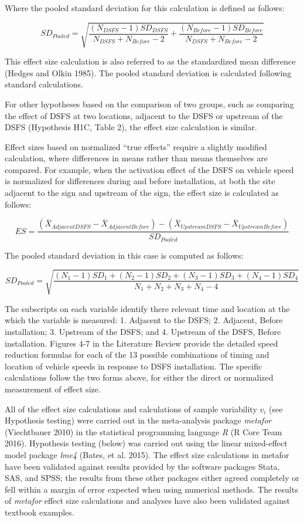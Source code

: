 \documentclass[]{article}
\begin{document}
Where the pooled standard deviation for this calculation is defined as
follows:

\[
SD_{Pooled} = \sqrt{\frac{(N_{DSFS}-1)SD_{DSFS}}{N_{DSFS} + N_{Before} -2 } + \frac{(N_{Before}-1)SD_{Before}}{N_{DSFS} + N_{Before} -2 }}
\]

This effect size calculation is also referred to as the standardized
mean difference (Hedges and Olkin 1985). The pooled standard deviation
is calculated following standard calculations.

For other hypotheses based on the comparison of two groups, such as
comparing the effect of DSFS at two locations, adjacent to the DSFS or
upstream of the DSFS (Hypothesis H1C, Table 2), the effect size
calculation is similar.

Effect sizes based on normalized ``true effects'' require a slightly
modified calculation, where differences in means rather than means
themselves are compared. For example, when the activation effect of the
DSFS on vehicle speed is normalized for differences during and before
installation, at both the site adjacent to the sign and upstream of the
sign, the effect size is calculated as follows:

\[ ES = \frac{(\bar{X}_{Adjacent DSFS} - \bar{X}_{Adjacent Before}) - (\bar{X}_{Upstream DSFS} - \bar{X}_{Upstream Before})}{SD_{Pooled}} \]

The pooled standard deviation in this case is computed as follows:

\[
SD_{Pooled} = \sqrt{\frac{(N_{1}-1)SD_{1} + (N_{2}-1)SD_{2} + (N_{3}-1)SD_{3} + (N_{4}-1)SD_{4} }{N_{1}+N_{2} + N_{3} + N_{4} - 4}}
\]

The subscripts on each variable identify there relevant time and
location at the which the variable is measured: 1. Adjacent to the DSFS;
2. Adjacent, Before installation; 3. Upstream of the DSFS; and 4.
Upstream of the DSFS, Before installation. Figures 4-7 in the Literature
Review provide the detailed speed reduction formulas for each of the 13
possible combinations of timing and location of vehicle speeds in
response to DSFS installation. The specific calculations follow the two
forms above, for either the direct or normalized measurement of effect
size.

All of the effect size calculations and calculations of sample
variability \(v_{i}\) (see Hypothesis testing) were carried out in the
meta-analysis package \emph{metafor} (Viechtbauer 2010) in the
statistical programming language \emph{R} (R Core Team 2016). Hypothesis
testing (below) was carried out using the linear mixed-effect model
package \emph{lme4} (Bates, et al. 2015). The effect size calculations
in metafor have been validated against results provided by the software
packages Stata, SAS, and SPSS; the results from these other packages
either agreed completely or fell within a margin of error expected when
using numerical methods. The results of \emph{metafor} effect size
calculations and analyses have also been validated against textbook
examples.
\end{document}
